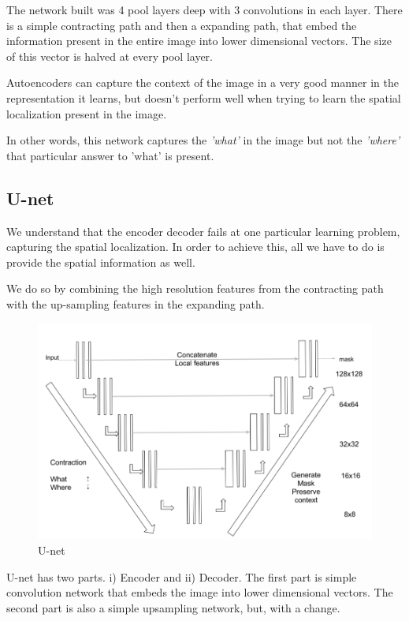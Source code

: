\documentclass[12pt, a4paper]{article}
\begin{document}
The network built was 4 pool layers deep with 3 convolutions in each layer. There is a simple contracting path and then a expanding path, that embed the information present in the entire image into lower dimensional vectors. The size of this vector is halved at every pool layer.

Autoencoders\cite{baldi2012autoencoders} can capture the context of the image in a very good manner in the representation it learns, but doesn't perform well when trying to learn the spatial localization present in the image.

In other words, this network captures the \emph{'what'} in the image but not the \emph{'where'} that particular answer to 'what' is present.
\newpage
\subsection{U-net}
We understand that the encoder decoder fails at one particular learning problem, capturing the spatial localization. In order to achieve this, all we have to do is provide the spatial information as well. 

We do so by combining the high resolution features from the contracting path with the up-sampling features in the expanding path. 

\begin{figure}[h] 
  \includegraphics[width=\linewidth]{unet.png}
  \caption[ ]{U-net}
  \label{fig:unet}
\end{figure}

U-net\cite{ronneberger2015u} has two parts. i) Encoder and ii) Decoder. The first part is simple convolution network that embeds the image into lower dimensional vectors. The second part is also a simple upsampling network, but, with a change.
\end{document}

